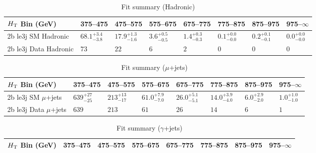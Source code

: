 \documentclass[8pt]{article}
\def\scalht{\mbox{$H_{\rm{T}}$}\xspace}
\newcommand\T{\rule{0pt}{2.6ex}}
\begin{document}
\begin{table}[ht!]
\caption{Fit summary (Hadronic)}
\label{tab:ensemble-summary}
\centering
\begin{tabular}{ llllllll }

\hline
\scalht Bin (GeV)       & 375--475                       & 475--575                       & 575--675                       & 675--775                       & 775--875                       & 875--975                       & 975--$\infty$                  \\ [1.000000ex]
\hline
2b le3j SM Hadronic\T   & $68.1^{+3.4}_{-3.8}$           & $17.9^{+1.3}_{-1.6}$           & $3.6^{+0.5}_{-0.5}$            & $1.4^{+0.3}_{-0.3}$            & $0.1^{+0.0}_{-0.0}$            & $0.2^{+0.1}_{-0.1}$            & $0.0^{+0.0}_{-0.0}$            \\ 
2b le3j Data Hadronic\T & $73$                           & $22$                           & $6$                            & $2$                            & $0$                            & $0$                            & $0$                            \\ 
\hline

\end{tabular}
\end{table}
\begin{table}[ht!]
\caption{Fit summary ($\mu$+jets)}
\label{tab:ensemble-summary}
\centering
\begin{tabular}{ llllllll }

\hline
\scalht Bin (GeV)       & 375--475                       & 475--575                       & 575--675                       & 675--775                       & 775--875                       & 875--975                       & 975--$\infty$                  \\ [1.000000ex]
\hline
2b le3j SM $\mu$+jets\T & $639^{+27}_{-25}$              & $213^{+13}_{-17}$              & $61.0^{+7.9}_{-7.0}$           & $26.0^{+5.1}_{-5.1}$           & $14.0^{+3.9}_{-4.0}$           & $6.0^{+2.9}_{-2.0}$            & $1.0^{+1.0}_{-1.0}$            \\ 
2b le3j Data $\mu$+jets\T & $639$                          & $213$                          & $61$                           & $26$                           & $14$                           & $6$                            & $1$                            \\ 
\hline

\end{tabular}
\end{table}
\begin{table}[ht!]
\caption{Fit summary ($\gamma$+jets)}
\label{tab:ensemble-summary}
\centering
\begin{tabular}{ llllllll }

\hline
\scalht Bin (GeV)       & 375--475                       & 475--575                       & 575--675                       & 675--775                       & 775--875                       & 875--975                       & 975--$\infty$                  \\ [1.000000ex]
\hline

\end{tabular}
\end{table}
\end{document}
